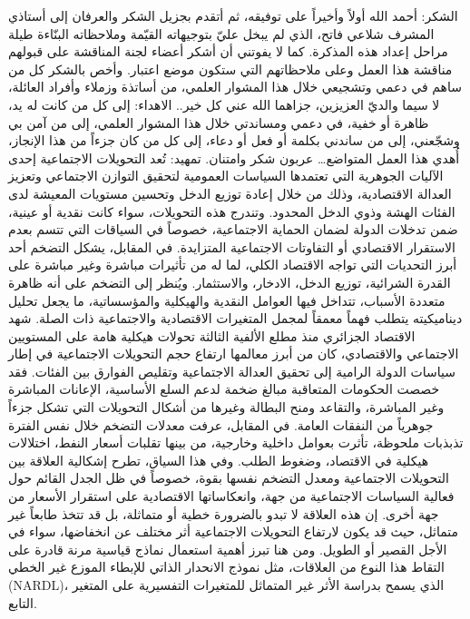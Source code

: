 \documentclass[12pt,a4paper]{report}
\begin{document}
الشكر: 
أحمد الله أولاً وأخيراً على توفيقه، ثم أتقدم بجزيل الشكر والعرفان إلى أستاذي المشرف شلاعي فاتح، الذي لم يبخل عليّ بتوجيهاته القيّمة وملاحظاته البنّاءة طيلة مراحل إعداد هذه المذكرة.
كما لا يفوتني أن أشكر أعضاء لجنة المناقشة على قبولهم مناقشة هذا العمل وعلى ملاحظاتهم التي ستكون موضع اعتبار.
وأخص بالشكر كل من ساهم في دعمي وتشجيعي خلال هذا المشوار العلمي، من أساتذة وزملاء وأفراد العائلة، لا سيما والديّ العزيزين، جزاهما الله عني كل خير..
الاهداء:
إلى كل من كانت له يد، ظاهرة أو خفية، في دعمي ومساندتي خلال هذا المشوار العلمي،
إلى من آمن بي وشجّعني، إلى من ساندني بكلمة أو فعل أو دعاء،
إلى كل من كان جزءاً من هذا الإنجاز،
أُهدي هذا العمل المتواضع… عربون شكر وامتنان.
تمهيد:
           تُعد التحويلات الاجتماعية إحدى الآليات الجوهرية التي تعتمدها السياسات العمومية لتحقيق التوازن الاجتماعي وتعزيز العدالة الاقتصادية، وذلك من خلال إعادة توزيع الدخل وتحسين مستويات المعيشة لدى الفئات الهشة وذوي الدخل المحدود. وتندرج هذه التحويلات، سواء كانت نقدية أو عينية، ضمن تدخلات الدولة لضمان الحماية الاجتماعية، خصوصاً في السياقات التي تتسم بعدم الاستقرار الاقتصادي أو التفاوتات الاجتماعية المتزايدة. 
            في المقابل، يشكل التضخم أحد أبرز التحديات التي تواجه الاقتصاد الكلي، لما له من تأثيرات مباشرة وغير مباشرة على القدرة الشرائية، توزيع الدخل، الادخار، والاستثمار. ويُنظر إلى التضخم على أنه ظاهرة متعددة الأسباب، تتداخل فيها العوامل النقدية والهيكلية والمؤسساتية، ما يجعل تحليل ديناميكيته يتطلب فهماً معمقاً لمجمل المتغيرات الاقتصادية والاجتماعية ذات الصلة.
            شهد الاقتصاد الجزائري منذ مطلع الألفية الثالثة تحولات هيكلية هامة على المستويين الاجتماعي والاقتصادي، كان من أبرز معالمها ارتفاع حجم التحويلات الاجتماعية في إطار سياسات الدولة الرامية إلى تحقيق العدالة الاجتماعية وتقليص الفوارق بين الفئات. فقد خصصت الحكومات المتعاقبة مبالغ ضخمة لدعم السلع الأساسية، الإعانات المباشرة وغير المباشرة، والتقاعد ومنح البطالة وغيرها من أشكال التحويلات التي تشكل جزءاً جوهرياً من النفقات العامة.
في المقابل، عرفت معدلات التضخم خلال نفس الفترة تذبذبات ملحوظة، تأثرت بعوامل داخلية وخارجية، من بينها تقلبات أسعار النفط، اختلالات هيكلية في الاقتصاد، وضغوط الطلب. وفي هذا السياق، تطرح إشكالية العلاقة بين التحويلات الاجتماعية ومعدل التضخم نفسها بقوة، خصوصاً في ظل الجدل القائم حول فعالية السياسات الاجتماعية من جهة، وانعكاساتها الاقتصادية على استقرار الأسعار من جهة أخرى. إن هذه العلاقة لا تبدو بالضرورة خطية أو متماثلة، بل قد تتخذ طابعاً غير متماثل، حيث قد يكون لارتفاع التحويلات الاجتماعية أثر مختلف عن انخفاضها، سواء في الأجل القصير أو الطويل. ومن هنا تبرز أهمية استعمال نماذج قياسية مرنة قادرة على التقاط هذا النوع من العلاقات، مثل نموذج الانحدار الذاتي للإبطاء الموزع غير الخطي (NARDL)، الذي يسمح بدراسة الأثر غير المتماثل للمتغيرات التفسيرية على المتغير التابع.
\end{document}
